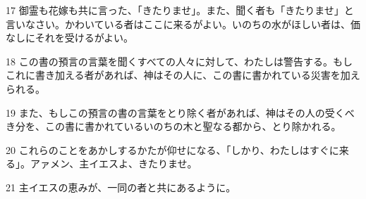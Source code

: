 \par 17 御霊も花嫁も共に言った、「きたりませ」。また、聞く者も「きたりませ」と言いなさい。かわいている者はここに来るがよい。いのちの水がほしい者は、価なしにそれを受けるがよい。
\par 18 この書の預言の言葉を聞くすべての人々に対して、わたしは警告する。もしこれに書き加える者があれば、神はその人に、この書に書かれている災害を加えられる。
\par 19 また、もしこの預言の書の言葉をとり除く者があれば、神はその人の受くべき分を、この書に書かれているいのちの木と聖なる都から、とり除かれる。
\par 20 これらのことをあかしするかたが仰せになる、「しかり、わたしはすぐに来る」。アァメン、主イエスよ、きたりませ。
\par 21 主イエスの恵みが、一同の者と共にあるように。


